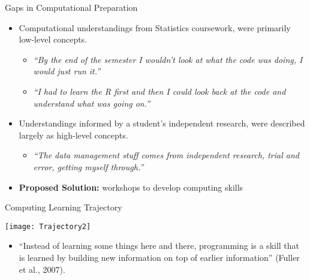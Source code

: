 \documentclass[10pt,ignorenonframetext,]{beamer}
\providecommand{\tightlist}{%
  \setlength{\itemsep}{0pt}\setlength{\parskip}{0pt}}
\begin{document}
\begin{frame}{Gaps in Computational Preparation}

\begin{itemize}[<+->]
\tightlist
\item
  Computational understandings from Statistics coursework, were
  primarily low-level concepts.

  \begin{itemize}[<+->]
  \tightlist
  \item
    \emph{``By the end of the semester I wouldn't look at what the code
    was doing, I would just run it.''}\\
  \item
    \emph{``I had to learn the R first and then I could look back at the
    code and understand what was going on.''}
  \end{itemize}
\item
  Understandings informed by a student's independent research, were
  described largely as high-level concepts.

  \begin{itemize}[<+->]
  \tightlist
  \item
    \emph{``The data management stuff comes from independent research,
    trial and error, getting myself through.''}
  \end{itemize}
\end{itemize}

\vspace{2cm}

\begin{itemize}[<+->]
\tightlist
\item
  \textbf{Proposed Solution:} workshops to develop computing skills
\end{itemize}

\end{frame}

\begin{frame}{Computing Learning Trajectory}

\vspace{4cm}

\begin{center}\texttt{[image: Trajectory2]} \end{center}

\begin{itemize}[<+->]
\tightlist
\item
  ``Instead of learning some things here and there, programming is a
  skill that is learned by building new information on top of earlier
  information'' (Fuller et al., 2007).
\end{itemize}

\end{frame}
\end{document}
